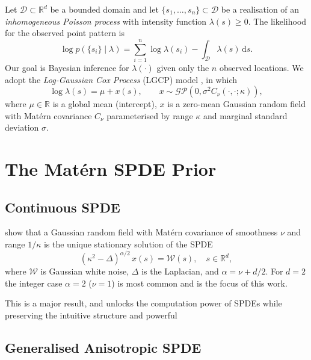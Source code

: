 \documentclass[11pt]{article}
\newcommand{\R}{\mathbb{R}}
\newcommand{\dd}{\,\mathrm{d}}
\begin{document}
Let $\mathcal{D} \subset \R^d$ be a bounded domain and let
$\{s_1, \ldots, s_n\} \subset \mathcal{D}$ be a realisation of an
\emph{inhomogeneous Poisson process} with intensity function $\lambda(s) \ge 0$.
The likelihood for the observed point pattern is
\begin{equation}
  \log p(\{s_i\} \mid \lambda) = \sum_{i=1}^n \log \lambda(s_i) - \int_{\mathcal{D}} \lambda(s) \dd s.
  \label{eq:poisson-ll}
\end{equation}
Our goal is Bayesian inference for $\lambda(\cdot)$ given only the $n$
observed locations.  We adopt the \emph{Log-Gaussian Cox Process} (LGCP)
model \citep{moller1998lgcp}, in which
\begin{equation}
  \log \lambda(s) = \mu + x(s), \qquad x \sim \mathcal{GP}(0, \sigma^2 C_\nu(\cdot,\cdot;\kappa)),
  \label{eq:lgcp}
\end{equation}
where $\mu \in \R$ is a global mean (intercept), $x$ is a zero-mean Gaussian
random field with Mat\'ern covariance $C_\nu$ parameterised by range $\kappa$
and marginal standard deviation $\sigma$.

\section{The Mat\'ern SPDE Prior}

\subsection{Continuous SPDE}

\citet{lindgren2011} show that a Gaussian random field with Mat\'ern covariance
of smoothness $\nu$ and range $1/\kappa$ is the unique stationary solution of the
SPDE
\begin{equation}
  (\kappa^2 - \Delta)^{\alpha/2} \, x(s) = \mathcal{W}(s), \quad s \in \R^d,
  \label{eq:spde}
\end{equation}
where $\mathcal{W}$ is Gaussian white noise, $\Delta$ is the Laplacian, and
$\alpha = \nu + d/2$.  For $d=2$ the integer case $\alpha=2$ ($\nu=1$) is most
common and is the focus of this work.

This is a major result, and unlocks the computation power of SPDEs while preserving the intuitive structure and powerful 

\subsection{Generalised Anisotropic SPDE}
\end{document}
